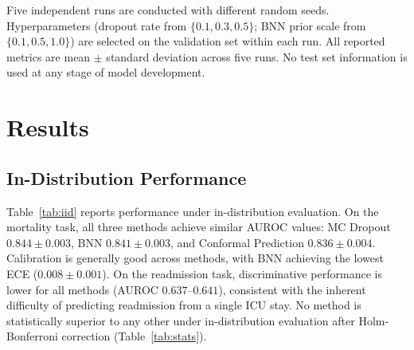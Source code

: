 \documentclass[11pt,a4paper]{article}
\begin{document}
Five independent runs are conducted with different random seeds. Hyperparameters (dropout rate from $\{0.1, 0.3, 0.5\}$; BNN prior scale from $\{0.1, 0.5, 1.0\}$) are selected on the validation set within each run. All reported metrics are mean $\pm$ standard deviation across five runs. No test set information is used at any stage of model development.

\section{Results}
\label{sec:results}

\subsection{In-Distribution Performance}

Table~\ref{tab:iid} reports performance under in-distribution evaluation. On the mortality task, all three methods achieve similar AUROC values: MC Dropout $0.844 \pm 0.003$, BNN $0.841 \pm 0.003$, and Conformal Prediction $0.836 \pm 0.004$. Calibration is generally good across methods, with BNN achieving the lowest ECE ($0.008 \pm 0.001$). On the readmission task, discriminative performance is lower for all methods (AUROC $0.637$--$0.641$), consistent with the inherent difficulty of predicting readmission from a single ICU stay. No method is statistically superior to any other under in-distribution evaluation after Holm-Bonferroni correction (Table~\ref{tab:stats}).
\end{document}
